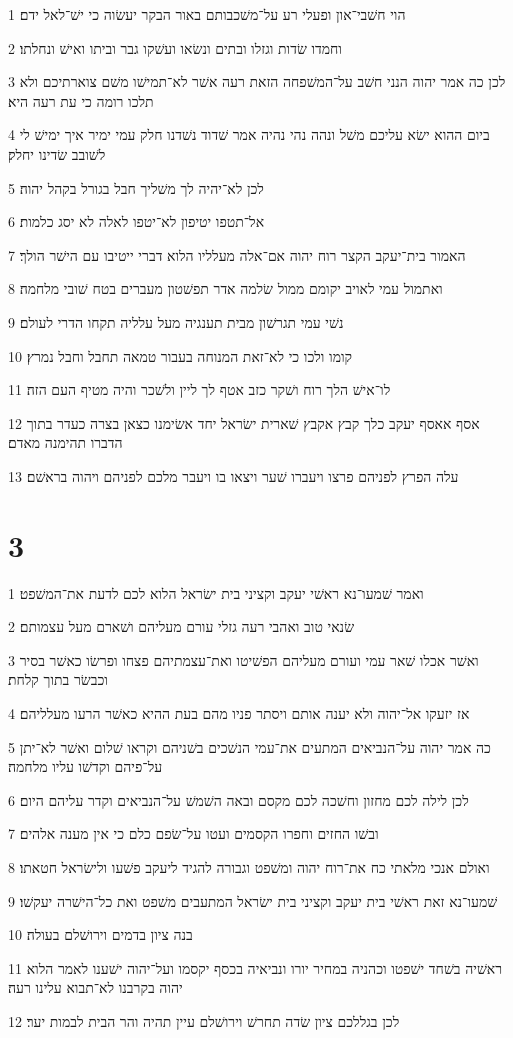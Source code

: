 \par 1 הוי חשׁבי־און ופעלי רע על־משׁכבותם באור הבקר יעשׂוה כי ישׁ־לאל ידם׃
\par 2 וחמדו שׂדות וגזלו ובתים ונשׂאו ועשׁקו גבר וביתו ואישׁ ונחלתו׃
\par 3 לכן כה אמר יהוה הנני חשׁב על־המשׁפחה הזאת רעה אשׁר לא־תמישׁו משׁם צוארתיכם ולא תלכו רומה כי עת רעה היא׃
\par 4 ביום ההוא ישׂא עליכם משׁל ונהה נהי נהיה אמר שׁדוד נשׁדנו חלק עמי ימיר איך ימישׁ לי לשׁובב שׂדינו יחלק׃
\par 5 לכן לא־יהיה לך משׁליך חבל בגורל בקהל יהוה׃
\par 6 אל־תטפו יטיפון לא־יטפו לאלה לא יסג כלמות׃
\par 7 האמור בית־יעקב הקצר רוח יהוה אם־אלה מעלליו הלוא דברי ייטיבו עם הישׁר הולך׃
\par 8 ואתמול עמי לאויב יקומם ממול שׂלמה אדר תפשׁטון מעברים בטח שׁובי מלחמה׃
\par 9 נשׁי עמי תגרשׁון מבית תענגיה מעל עלליה תקחו הדרי לעולם׃
\par 10 קומו ולכו כי לא־זאת המנוחה בעבור טמאה תחבל וחבל נמרץ׃
\par 11 לו־אישׁ הלך רוח ושׁקר כזב אטף לך ליין ולשׁכר והיה מטיף העם הזה׃
\par 12 אסף אאסף יעקב כלך קבץ אקבץ שׁארית ישׂראל יחד אשׂימנו כצאן בצרה כעדר בתוך הדברו תהימנה מאדם׃
\par 13 עלה הפרץ לפניהם פרצו ויעברו שׁער ויצאו בו ויעבר מלכם לפניהם ויהוה בראשׁם׃

\chapter{3}

\par 1 ואמר שׁמעו־נא ראשׁי יעקב וקציני בית ישׂראל הלוא לכם לדעת את־המשׁפט׃
\par 2 שׂנאי טוב ואהבי רעה גזלי עורם מעליהם ושׁארם מעל עצמותם׃
\par 3 ואשׁר אכלו שׁאר עמי ועורם מעליהם הפשׁיטו ואת־עצמתיהם פצחו ופרשׂו כאשׁר בסיר וכבשׂר בתוך קלחת׃
\par 4 אז יזעקו אל־יהוה ולא יענה אותם ויסתר פניו מהם בעת ההיא כאשׁר הרעו מעלליהם׃
\par 5 כה אמר יהוה על־הנביאים המתעים את־עמי הנשׁכים בשׁניהם וקראו שׁלום ואשׁר לא־יתן על־פיהם וקדשׁו עליו מלחמה׃
\par 6 לכן לילה לכם מחזון וחשׁכה לכם מקסם ובאה השׁמשׁ על־הנביאים וקדר עליהם היום׃
\par 7 ובשׁו החזים וחפרו הקסמים ועטו על־שׂפם כלם כי אין מענה אלהים׃
\par 8 ואולם אנכי מלאתי כח את־רוח יהוה ומשׁפט וגבורה להגיד ליעקב פשׁעו ולישׂראל חטאתו׃
\par 9 שׁמעו־נא זאת ראשׁי בית יעקב וקציני בית ישׂראל המתעבים משׁפט ואת כל־הישׁרה יעקשׁו׃
\par 10 בנה ציון בדמים וירושׁלם בעולה׃
\par 11 ראשׁיה בשׁחד ישׁפטו וכהניה במחיר יורו ונביאיה בכסף יקסמו ועל־יהוה ישׁענו לאמר הלוא יהוה בקרבנו לא־תבוא עלינו רעה׃
\par 12 לכן בגללכם ציון שׂדה תחרשׁ וירושׁלם עיין תהיה והר הבית לבמות יער׃

